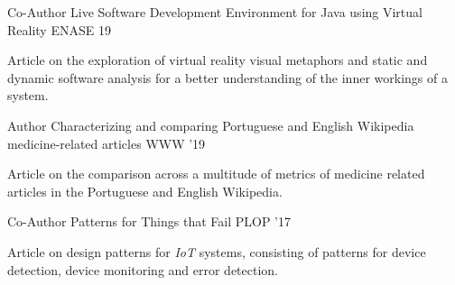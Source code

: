 

\begin{cventries}

  \cventry
    {Co-Author} %
    {Live Software Development Environment for Java using Virtual Reality} %
    {ENASE 19} %
    {} %
    {
      \begin{cvitems} %
        \item {Article on the exploration of virtual reality visual metaphors and static and dynamic software analysis for a better understanding of the inner workings of a system.}
      \end{cvitems}
    }

  \cventry
    {Author} %
    {Characterizing and comparing Portuguese and English Wikipedia medicine-related articles} %
    {WWW '19} %
    {} %
    {
      \begin{cvitems} %
        \item {Article on the comparison across a multitude of metrics of medicine related articles in the Portuguese and English Wikipedia.}
      \end{cvitems}
    }
    
  \cventry
    {Co-Author} %
    {Patterns for Things that Fail} %
    {PLOP '17} %
    {} %
    {
      \begin{cvitems} %
        \item {Article on design patterns for \textit{IoT} systems, consisting of patterns for device detection, device monitoring and error detection.}
      \end{cvitems}
    }

\end{cventries}
